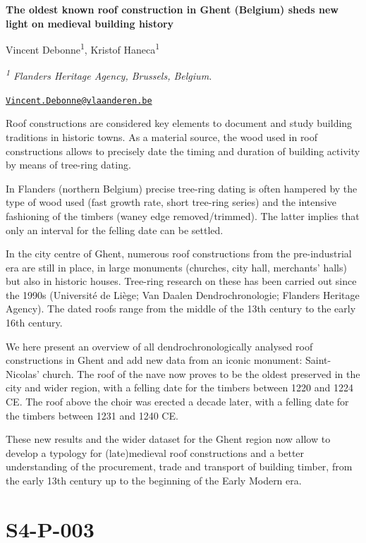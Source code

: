 \documentclass[
]{book}
\begin{document}
\textbf{The oldest known roof construction in Ghent (Belgium) sheds new light on medieval building history}

Vincent Debonne\textsuperscript{1}, Kristof Haneca\textsuperscript{1}

\emph{\textsuperscript{1} Flanders Heritage Agency, Brussels, Belgium.}

\href{mailto:Vincent.Debonne@vlaanderen.be}{\nolinkurl{Vincent.Debonne@vlaanderen.be}}

Roof constructions are considered key elements to document and study building traditions in historic towns. As a material source, the wood used in roof constructions allows to precisely date the timing and duration of building activity by means of tree-ring dating.

In Flanders (northern Belgium) precise tree-ring dating is often hampered by the type of wood used (fast growth rate, short tree-ring series) and the intensive fashioning of the timbers (waney edge removed/trimmed). The latter implies that only an interval for the felling date can be settled.

In the city centre of Ghent, numerous roof constructions from the pre-industrial era are still in place, in large monuments (churches, city hall, merchants' halls) but also in historic houses. Tree-ring research on these has been carried out since the 1990s (Université de Liège; Van Daalen Dendrochronologie; Flanders Heritage Agency). The dated roofs range from the middle of the 13th century to the early 16th century.

We here present an overview of all dendrochronologically analysed roof constructions in Ghent and add new data from an iconic monument: Saint-Nicolas' church. The roof of the nave now proves to be the oldest preserved in the city and wider region, with a felling date for the timbers between 1220 and 1224 CE. The roof above the choir was erected a decade later, with a felling date for the timbers between 1231 and 1240 CE.

These new results and the wider dataset for the Ghent region now allow to develop a typology for (late)medieval roof constructions and a better understanding of the procurement, trade and transport of building timber, from the early 13th century up to the beginning of the Early Modern era.

\hypertarget{s4-p-003}{%
\section*{S4-P-003}\label{s4-p-003}}
\end{document}
